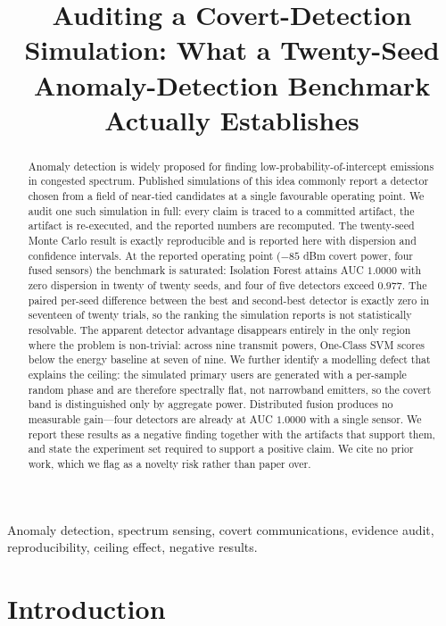 \documentclass[conference]{IEEEtran}
\title{Auditing a Covert-Detection Simulation: What a Twenty-Seed Anomaly-Detection Benchmark Actually Establishes}
\author{\IEEEauthorblockN{Fernando May}
\IEEEauthorblockA{Instituto Polit\'ecnico Nacional, Mexico\\
Email: fernando.may@ieee.org}}
\begin{document}
\maketitle

\begin{abstract}
Anomaly detection is widely proposed for finding low-probability-of-intercept emissions in congested spectrum. Published simulations of this idea commonly report a detector chosen from a field of near-tied candidates at a single favourable operating point. We audit one such simulation in full: every claim is traced to a committed artifact, the artifact is re-executed, and the reported numbers are recomputed. The twenty-seed Monte Carlo result is exactly reproducible and is reported here with dispersion and confidence intervals. At the reported operating point ($-85$ dBm covert power, four fused sensors) the benchmark is saturated: Isolation Forest attains AUC $1.0000$ with zero dispersion in twenty of twenty seeds, and four of five detectors exceed $0.977$. The paired per-seed difference between the best and second-best detector is exactly zero in seventeen of twenty trials, so the ranking the simulation reports is not statistically resolvable. The apparent detector advantage disappears entirely in the only region where the problem is non-trivial: across nine transmit powers, One-Class SVM scores below the energy baseline at seven of nine. We further identify a modelling defect that explains the ceiling: the simulated primary users are generated with a per-sample random phase and are therefore spectrally flat, not narrowband emitters, so the covert band is distinguished only by aggregate power. Distributed fusion produces no measurable gain---four detectors are already at AUC $1.0000$ with a single sensor. We report these results as a negative finding together with the artifacts that support them, and state the experiment set required to support a positive claim. We cite no prior work, which we flag as a novelty risk rather than paper over.
\end{abstract}

\begin{IEEEkeywords}
Anomaly detection, spectrum sensing, covert communications, evidence audit, reproducibility, ceiling effect, negative results.
\end{IEEEkeywords}

\section{Introduction}
\label{sec:intro}
\end{document}
